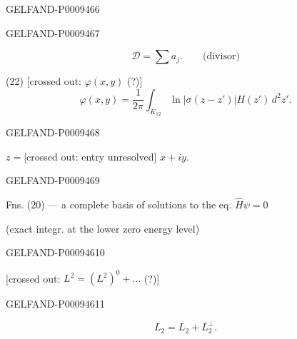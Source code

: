 \begin{GelfandAdjacentEvidence}{GELFAND-P000946}{6}

\end{GelfandAdjacentEvidence}
\begin{GelfandAdjacentEvidence}{GELFAND-P000946}{7}

\[
 \mathcal D=\sum a_j.\qquad\text{(divisor)}
\]

(22) [crossed out: \sout{\(\varphi(x,y)\)} (?)]
\begin{equation*}
 \varphi(x,y)=\frac{1}{2\pi}\int_{K_{12}}\ln|\sigma(z-z')|H(z')\,d^2z'.
\end{equation*}
\end{GelfandAdjacentEvidence}
\begin{GelfandAdjacentEvidence}{GELFAND-P000946}{8}

\(z={}\)[crossed out: entry unresolved] \(x+iy\).
\end{GelfandAdjacentEvidence}
\begin{GelfandAdjacentEvidence}{GELFAND-P000946}{9}


Fns. (20) --- a complete basis of solutions to the eq. $\hat H\psi=0$

(exact integr. at the lower zero energy level)
\end{GelfandAdjacentEvidence}
\begin{GelfandAdjacentEvidence}{GELFAND-P000946}{10}


[crossed out: $L^2=(L^2)^0+\ldots$ (?)]
\end{GelfandAdjacentEvidence}
\begin{GelfandAdjacentEvidence}{GELFAND-P000946}{11}

\[
 L_2=L_2+L_2^\perp.
\]
\end{GelfandAdjacentEvidence}
